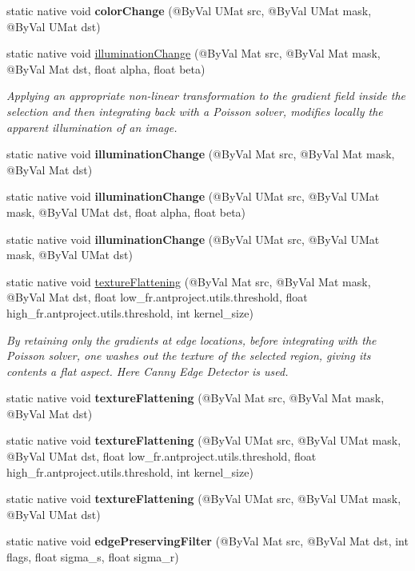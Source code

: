 \begin{DoxyCompactItemize}
static native void {\bfseries color\+Change} (@By\+Val U\+Mat src, @By\+Val U\+Mat mask, @By\+Val U\+Mat dst)
\item 
static native void \hyperlink{group__photo__clone_gab7df287c3db8bb77269a05cb1e758591}{illumination\+Change} (@By\+Val Mat src, @By\+Val Mat mask, @By\+Val Mat dst, float alpha, float beta)
\begin{DoxyCompactList}\small\item\em Applying an appropriate non-\/linear transformation to the gradient field inside the selection and then integrating back with a Poisson solver, modifies locally the apparent illumination of an image. \end{DoxyCompactList}\item 
static native void {\bfseries illumination\+Change} (@By\+Val Mat src, @By\+Val Mat mask, @By\+Val Mat dst)
\item 
static native void {\bfseries illumination\+Change} (@By\+Val U\+Mat src, @By\+Val U\+Mat mask, @By\+Val U\+Mat dst, float alpha, float beta)
\item 
static native void {\bfseries illumination\+Change} (@By\+Val U\+Mat src, @By\+Val U\+Mat mask, @By\+Val U\+Mat dst)
\item 
static native void \hyperlink{group__photo__clone_ga8d42433222e7742e59e275e148c3d4a5}{texture\+Flattening} (@By\+Val Mat src, @By\+Val Mat mask, @By\+Val Mat dst, float low\+\_\+fr.antproject.utils.threshold, float high\+\_\+fr.antproject.utils.threshold, int kernel\+\_\+size)
\begin{DoxyCompactList}\small\item\em By retaining only the gradients at edge locations, before integrating with the Poisson solver, one washes out the texture of the selected region, giving its contents a flat aspect. Here Canny Edge Detector is used. \end{DoxyCompactList}\item 
static native void {\bfseries texture\+Flattening} (@By\+Val Mat src, @By\+Val Mat mask, @By\+Val Mat dst)
\item 
static native void {\bfseries texture\+Flattening} (@By\+Val U\+Mat src, @By\+Val U\+Mat mask, @By\+Val U\+Mat dst, float low\+\_\+fr.antproject.utils.threshold, float high\+\_\+fr.antproject.utils.threshold, int kernel\+\_\+size)
\item 
static native void {\bfseries texture\+Flattening} (@By\+Val U\+Mat src, @By\+Val U\+Mat mask, @By\+Val U\+Mat dst)
\item 
static native void {\bfseries edge\+Preserving\+Filter} (@By\+Val Mat src, @By\+Val Mat dst, int flags, float sigma\+\_\+s, float sigma\+\_\+r)

\end{DoxyCompactItemize}
